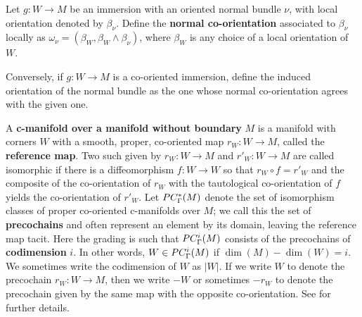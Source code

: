 \begin{definition}\label{D:normal co-or}
	Let $g \colon W \to M$ be an immersion with an oriented normal bundle $\nu$, with local orientation denoted by $\beta_\nu$.
	Define the \textbf{normal co-orientation} associated to $\beta_\nu$ locally as $\omega_{\nu} = (\beta_W, \beta_W \wedge \beta_\nu)$, where	$\beta_W$ is any choice of a local orientation of $W$.

	Conversely, if $g \colon W \to M$ is a co-oriented immersion, define the induced orientation of the normal bundle as the one whose normal co-orientation	agrees with the given one.
\end{definition}

\begin{definition}\label{V: maps are co-oriented}
	A \textbf{c-manifold over a manifold without boundary} $M$ is a
	manifold with corners $W$ with a smooth, proper, co-oriented map $r_W \colon W \to M$, called the \textbf{reference map}.
	Two such given by $r_W \colon W \to M$ and $r'_W \colon W \to M$ are called isomorphic if there is a diffeomorphism $f \colon W \to W$ so that $r_W \circ f = r'_W$ and the composite of the co-orientation of $r_W$ with the tautological co-orientation of $f$ yields the co-orientation of $r'_W$.
	Let $PC_\Gamma^*(M)$ denote the set of isomorphism classes of proper co-oriented c-manifolds over $M$; we call this the set of \textbf{precochains} and often represent an element by its domain, leaving the reference map tacit.
	Here the grading is such that $PC_\Gamma^i(M)$ consists of the precochains of \textbf{codimension} $i$.
	In other words, $W \in PC_\Gamma^i(M)$ if $\dim(M)-\dim(W) = i$.
	We sometimes write the codimension of $W$ as $|W|$.
	If we write $W$ to denote the precochain $r_W \colon W \to M$, then we write $-W$ or sometimes $-r_W$ to denote the precochain given by the same map with the opposite co-orientation.
	See \cite[Section 4.2]{medina2022foundations} for further details.
\end{definition}

\begin{comment}
	Let $\cman_\Gamma^*(M)$ be the free abelian group generated by $\cman_\Gamma(M)$, graded by the \textbf{codimension} $|W|$, modulo the following relations:
	\begin{enumerate}
		\item ${V \sqcup W} = V + W$,
		\item ${{W}^{op}} = -W$, where ${W}^{op}$ denotes the co-oriented manifold over $M$ obtained by reversing the co-orientation.
	\end{enumerate}



We take a free abelian group and then quotient by the first relation instead of defining sum as disjoint union as in \cite{Lipy14} since we define our manifolds with corners as subspaces of a fixed universe, which complicates self addition through union.
By these relations any element of $\cman_\Gamma^*(M)$ is represented by a single map from a likely disconnected manifold with corners, as in particular one can find as many ``copies'' as one needs of any manifold with corners embedded in $\R^\infty$.
\end{comment}


